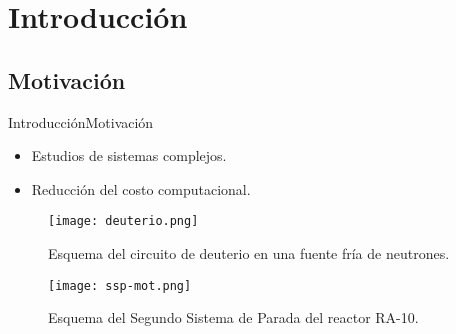 \section{Introducción}

\subsection{Motivación}

\begin{frame}{Introducción}{Motivación}
  \begin{itemize}
  \item {
    Estudios de sistemas complejos.
  }
  \item {
    Reducción del costo computacional.
  }
  \end{itemize}
  
  

  \begin{figure}[ht]
    \begin{minipage}{0.4\linewidth}
      \centering
      \texttt{[image: deuterio.png]}
      \caption[]{Esquema del circuito de deuterio en una fuente fría de neutrones.}
      \label{fuente-fria-mot}	
    \end{minipage}
    \begin{minipage}{0.58\linewidth}
      \centering
      \texttt{[image: ssp-mot.png]}
      \caption[]{Esquema del Segundo Sistema de Parada del reactor RA-10.}
      \label{ssp-mot}	
    \end{minipage}
    \label{aasdasd}
  \end{figure}
  
\end{frame}

